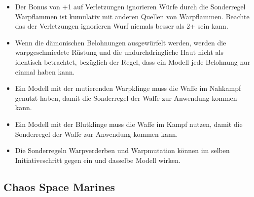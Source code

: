\begin{itemize}
 \item Der Bonus von +1 auf Verletzungen ignorieren Würfe durch die Sonderregel
  Warpflammen ist kumulativ mit anderen Quellen von Warpflammen. Beachte das der
  Verletzungen ignorieren Wurf niemals besser als 2+ sein kann.

 \item Wenn die dämonischen Belohnungen ausgewürfelt werden, werden die
  warpgeschmiedete Rüstung und die undurchdringliche Haut nicht als identisch
  betrachtet, bezüglich der Regel, dass ein Modell jede Belohnung nur einmal
  haben kann.

 \item Ein Modell mit der mutierenden Warpklinge muss die Waffe im Nahkampf
  genutzt haben, damit die Sonderregel der Waffe zur Anwendung kommen kann.

 \item Ein Modell mit der Blutklinge muss die Waffe im Kampf nutzen, damit die
  Sonderregel der Waffe zur Anwendung kommen kann.

 \item Die Sonderregeln Warpverderben und Warpmutation können im selben
  Initiativeschritt gegen ein und dasselbe Modell wirken.

\end{itemize}

\subsection{Chaos Space Marines}

